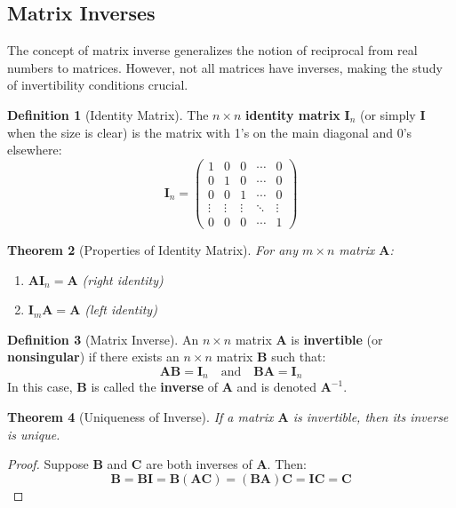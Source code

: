 \documentclass[12pt]{article}
\numberwithin{equation}{section}
\newcommand{\mat}[1]{\mathbf{#1}}        %
\theoremstyle{plain}
\newtheorem{theorem}{Theorem}[section]
\theoremstyle{definition}
\newtheorem{definition}[theorem]{Definition}
\theoremstyle{remark}
\begin{document}
\subsection{Matrix Inverses}

The concept of matrix inverse generalizes the notion of reciprocal from real numbers to matrices. However, not all matrices have inverses, making the study of invertibility conditions crucial.

\begin{definition}[Identity Matrix]
The $n \times n$ \textbf{identity matrix} $\mat{I}_n$ (or simply $\mat{I}$ when the size is clear) is the matrix with 1's on the main diagonal and 0's elsewhere:
$$\mat{I}_n = \begin{pmatrix}
1 & 0 & 0 & \cdots & 0\\
0 & 1 & 0 & \cdots & 0\\
0 & 0 & 1 & \cdots & 0\\
\vdots & \vdots & \vdots & \ddots & \vdots\\
0 & 0 & 0 & \cdots & 1
\end{pmatrix}$$
\end{definition}

\begin{theorem}[Properties of Identity Matrix]
For any $m \times n$ matrix $\mat{A}$:
\begin{enumerate}
\item $\mat{A}\mat{I}_n = \mat{A}$ (right identity)
\item $\mat{I}_m\mat{A} = \mat{A}$ (left identity)
\end{enumerate}
\end{theorem}

\begin{definition}[Matrix Inverse]
An $n \times n$ matrix $\mat{A}$ is \textbf{invertible} (or \textbf{nonsingular}) if there exists an $n \times n$ matrix $\mat{B}$ such that:
$$\mat{A}\mat{B} = \mat{I}_n \quad \text{and} \quad \mat{B}\mat{A} = \mat{I}_n$$
In this case, $\mat{B}$ is called the \textbf{inverse} of $\mat{A}$ and is denoted $\mat{A}^{-1}$.
\end{definition}

\begin{theorem}[Uniqueness of Inverse]
If a matrix $\mat{A}$ is invertible, then its inverse is unique.
\end{theorem}

\begin{proof}
Suppose $\mat{B}$ and $\mat{C}$ are both inverses of $\mat{A}$. Then:
$$\mat{B} = \mat{B}\mat{I} = \mat{B}(\mat{A}\mat{C}) = (\mat{B}\mat{A})\mat{C} = \mat{I}\mat{C} = \mat{C}$$
\end{proof}
\end{document}

